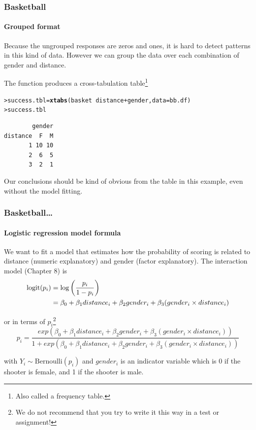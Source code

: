 \documentclass{beamer}\usepackage[]{graphicx}\usepackage[]{xcolor}
\makeatletter
\newcommand{\hlopt}[1]{\textcolor[rgb]{0,0,0}{#1}}%
\newcommand{\hlstd}[1]{\textcolor[rgb]{0.345,0.345,0.345}{#1}}%
\newcommand{\hlkwb}[1]{\textcolor[rgb]{0.69,0.353,0.396}{#1}}%
\newcommand{\hlkwc}[1]{\textcolor[rgb]{0.333,0.667,0.333}{#1}}%
\newcommand{\hlkwd}[1]{\textcolor[rgb]{0.737,0.353,0.396}{\textbf{#1}}}%
\newenvironment{kframe}{%
 \def\at@end@of@kframe{}%
 \ifinner\ifhmode%
  \def\at@end@of@kframe{\end{minipage}}%
  \begin{minipage}{\columnwidth}%
 \fi\fi%
 \def\FrameCommand##1{\hskip\@totalleftmargin \hskip-\fboxsep
 \colorbox{shadecolor}{##1}\hskip-\fboxsep
     \hskip-\linewidth \hskip-\@totalleftmargin \hskip\columnwidth}%
 \MakeFramed {\advance\hsize-\width
   \@totalleftmargin\z@ \linewidth\hsize
   \@setminipage}}%
 {\par\unskip\endMakeFramed%
 \at@end@of@kframe}
\newenvironment{knitrout}{}{} %
\makeatother
\begin{document}
\begin{frame}[fragile]
\frametitle{Basketball}
\framesubtitle{Grouped format}
Because the ungrouped responses are zeros and ones, it is hard to detect patterns in this kind of data. However we can group the data over each combination of gender and distance. 
\medskip

The  function produces a cross-tabulation table\footnote{Also called a frequency table.}

\begin{knitrout}\scriptsize
{}\color{fgcolor}\begin{kframe}
\begin{alltt}
\hlstd{> }\hlstd{success.tbl} \hlkwb{=} \hlkwd{xtabs}\hlstd{(basket}\hlopt{~}\hlstd{distance}\hlopt{+}\hlstd{gender,} \hlkwc{data} \hlstd{= bb.df)}
\hlstd{> }\hlstd{success.tbl}
\end{alltt}
\begin{verbatim}
        gender
distance  F  M
       1 10 10
       2  6  5
       3  2  1
\end{verbatim}
\end{kframe}
\end{knitrout}
Our conclusions should be kind of obvious from the table in this example, even without the model fitting.
\end{frame}


\begin{frame}[fragile]
\frametitle{Basketball\ldots}
\framesubtitle{Logistic regression model formula}
We want to fit a model that estimates how the probability of scoring is related to distance (numeric explanatory) and gender (factor explanatory). The interaction model (Chapter 8) is
\[
\begin{split}
\operatorname{logit}(p_i) &= \log\left(\frac{p_i}{1 - p_i}\right) \\
            &= \beta_0 + \beta_1 distance_i + \beta_2 gender_i + \beta_3 (gender_i \times distance_i)
\end{split}
\]

or in terms of $p_i$\footnote{We do not recommend that you try to write it this way in a test or assignment!}
\[
p_i = \frac{exp(\beta_0 + \beta_1 distance_i + \beta_2 gender_i + \beta_3 (gender_i \times distance_i))}{1 + exp(\beta_0 + \beta_1 distance_i + \beta_2 gender_i + \beta_3 (gender_i \times distance_i))}
\]

with $Y_i \sim \text{Bernoulli}(p_i)$ and $gender_i$ is an indicator variable which is 0 if the shooter is female, and 1 if the shooter is male.

\vspace{1em}

\end{frame}
\end{document}
